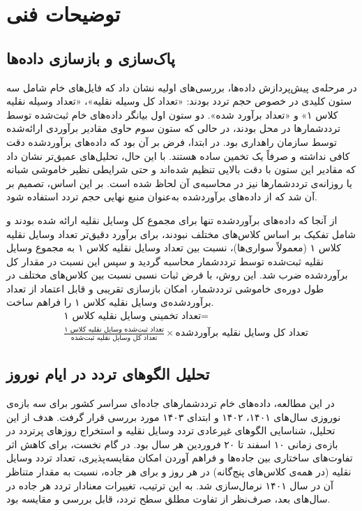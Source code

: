 \documentclass[a4paper, 12pt]{article}
\begin{document}
\newpage
\section{توضیحات فنی}

\subsection{پاک‌سازی و بازسازی داده‌ها}

در مرحله‌ی پیش‌پردازش داده‌ها، بررسی‌های اولیه نشان داد که فایل‌های خام شامل سه ستون کلیدی در خصوص حجم تردد بودند: «تعداد کل وسیله نقلیه»، «تعداد وسیله نقلیه کلاس ۱» و «تعداد برآورد شده». دو ستون اول بیانگر داده‌های خام ثبت‌شده توسط ترددشمارها در محل بودند، در حالی که ستون سوم حاوی مقادیر برآوردی ارائه‌شده توسط سازمان راهداری بود. در ابتدا، فرض بر آن بود که داده‌های برآوردشده دقت کافی نداشته و صرفاً یک تخمین ساده هستند. با این حال، تحلیل‌های عمیق‌تر نشان داد که مقادیر این ستون با دقت بالایی تنظیم شده‌اند و حتی شرایطی نظیر خاموشی شبانه یا روزانه‌ی ترددشمارها نیز در محاسبه‌ی آن لحاظ شده است. بر این اساس، تصمیم بر آن شد که از داده‌های برآوردشده به‌عنوان منبع نهایی حجم تردد استفاده شود.

\medskip
از آنجا که داده‌های برآوردشده تنها برای مجموع کل وسایل نقلیه ارائه شده بودند و شامل تفکیک بر اساس کلاس‌های مختلف نبودند، برای برآورد دقیق‌تر تعداد وسایل نقلیه کلاس ۱ (معمولاً سواری‌ها)، نسبت بین تعداد وسایل نقلیه کلاس ۱ به مجموع وسایل نقلیه ثبت‌شده توسط ترددشمار محاسبه گردید و سپس این نسبت در مقدار کل برآوردشده ضرب شد. این روش، با فرض ثبات نسبی نسبت بین کلاس‌های مختلف در طول دوره‌ی خاموشی ترددشمار، امکان بازسازی تقریبی و قابل اعتماد از تعداد برآوردشده‌ی وسایل نقلیه کلاس ۱ را فراهم ساخت. 
\[
\begin{aligned}
    & \text{تعداد تخمینی وسایل نقلیه کلاس ۱} = \\
& \frac{\text{تعداد ثبت‌شده وسایل نقلیه کلاس ۱}}{\text{تعداد کل وسایل نقلیه ثبت‌شده}} \times 
\text{تعداد کل وسایل نقلیه برآوردشده}
\end{aligned}
\]
\subsection{تحلیل الگوهای تردد در ایام نوروز}

در این مطالعه، داده‌های خام ترددشمارهای جاده‌ای سراسر کشور برای سه بازه‌ی نوروزی سال‌های ۱۴۰۱، ۱۴۰۲ و ابتدای ۱۴۰۳ مورد بررسی قرار گرفت. هدف از این تحلیل، شناسایی الگوهای غیرعادی تردد وسایل نقلیه و استخراج روزهای پرتردد در بازه‌ی زمانی ۱۰ اسفند تا ۲۰ فروردین هر سال بود. در گام نخست، برای کاهش اثر تفاوت‌های ساختاری بین جاده‌ها و فراهم آوردن امکان مقایسه‌پذیری، تعداد تردد وسایل نقلیه (در همه‌ی کلاس‌های پنج‌گانه) در هر روز و برای هر جاده، نسبت به مقدار متناظر آن در سال ۱۴۰۱ نرمال‌سازی شد. به این ترتیب، تغییرات معنادار تردد هر جاده در سال‌های بعد، صرف‌نظر از تفاوت مطلق سطح تردد، قابل بررسی و مقایسه بود.
\end{document}

